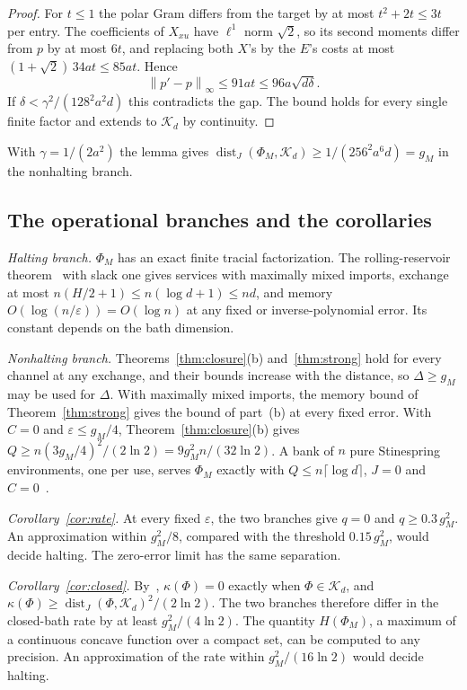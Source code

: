 \documentclass[11pt]{article}
\theoremstyle{definition}
\theoremstyle{remark}
\DeclareMathOperator{\dist}{dist}
\newcommand{\K}{\mathcal K}
\newcommand{\norm}[1]{\left\lVert#1\right\rVert}
\newcommand{\eps}{\varepsilon}
\begin{document}
\begin{proof}
For $t\le1$ the polar Gram differs from the target by at most $t^2+2t\le3t$ per entry. The coefficients of $X_{xu}$ have $\ell^1$ norm $\sqrt2$, so its second moments differ from $p$ by at most $6t$, and replacing both $X$'s by the $E$'s costs at most $(1+\sqrt2)\,34at\le85at$. Hence
\[
 \norm{p'-p}_\infty\le91at\le96a\sqrt{d\delta}.
\]
If $\delta<\gamma^2/(128^2a^2d)$ this contradicts the gap. The bound holds for every single finite factor and extends to $\K_d$ by continuity.
\end{proof}

With $\gamma=1/(2a^2)$ the lemma gives $\dist_J(\Phi_M,\K_d)\ge1/(256^2a^6d)=g_M$ in the nonhalting branch.

\subsection{The operational branches and the corollaries}

\emph{Halting branch.} $\Phi_M$ has an exact finite tracial factorization. The rolling-reservoir theorem~\cite[Theorem~6.1]{Memory} with slack one gives services with maximally mixed imports, exchange at most $n(H/2+1)\le n(\log d+1)\le nd$, and memory $O(\log(n/\eps))=O(\log n)$ at any fixed or inverse-polynomial error. Its constant depends on the bath dimension.

\emph{Nonhalting branch.} Theorems~\ref{thm:closure}(b) and~\ref{thm:strong} hold for every channel at any exchange, and their bounds increase with the distance, so $\Delta\ge g_M$ may be used for $\Delta$. With maximally mixed imports, the memory bound of Theorem~\ref{thm:strong} gives the bound of part~(b) at every fixed error. With $C=0$ and $\eps\le g_M/4$, Theorem~\ref{thm:closure}(b) gives $Q\ge n(3g_M/4)^2/(2\ln2)=9g_M^2n/(32\ln2)$. A bank of $n$ pure Stinespring environments, one per use, serves $\Phi_M$ exactly with $Q\le n\lceil\log d\rceil$, $J=0$ and $C=0$~\cite[Section~III]{RybarZiman}.

\emph{Corollary~\ref{cor:rate}.} At every fixed $\eps$, the two branches give $q=0$ and $q\ge0.3\,g_M^2$. An approximation within $g_M^2/8$, compared with the threshold $0.15\,g_M^2$, would decide halting. The zero-error limit has the same separation.

\emph{Corollary~\ref{cor:closed}.} By~\cite[Theorem~3.2(a)]{Memory}, $\kappa(\Phi)=0$ exactly when $\Phi\in\K_d$, and $\kappa(\Phi)\ge\dist_J(\Phi,\K_d)^2/(2\ln2)$. The two branches therefore differ in the closed-bath rate by at least $g_M^2/(4\ln2)$. The quantity $H(\Phi_M)$, a maximum of a continuous concave function over a compact set, can be computed to any precision. An approximation of the rate within $g_M^2/(16\ln2)$ would decide halting.
\end{document}
